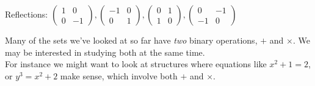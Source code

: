 \documentclass[twoside]{scrartcl}
\begin{document}
\begin{example}
Reflections: $\begin{pmatrix}  %
1 & 0 \\ 0 & -1	\end{pmatrix}
, \begin{pmatrix}  %
-1 & 0 \\ 0& 1	
\end{pmatrix}
, 
\begin{pmatrix}		%
0 & 1 \\ 1 & 0     %
\end{pmatrix}
,
\begin{pmatrix}  %
0 & -1 \\ -1& 0	 %
\end{pmatrix}$
\end{example}


 
 
 


 
 




 Many  
of the sets we've looked at so far have \emph{two} binary operations, $+$ and $\times$. We may be interested in studying both at the same time.\\
 
 For instance we might want to look at structures where equations like $x^2 + 1 = 2$, or $y^3 = x^2 + 2$ make sense, which involve both $+$ and $\times$.\\
 
\end{document}
